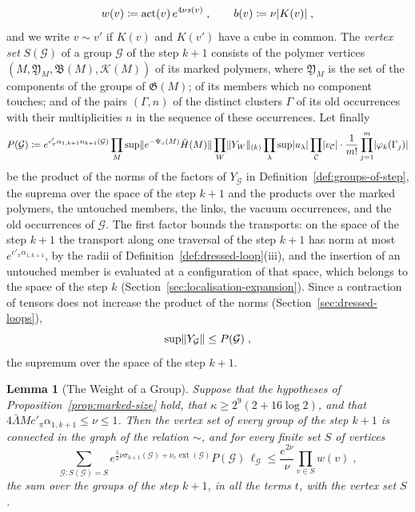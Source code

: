 \documentclass[11pt]{preprint}
\DeclarePairedDelimiter{\abs}{\lvert}{\rvert}
\DeclarePairedDelimiter{\norm}{\lVert}{\rVert}
\numberwithin{equation}{section}
\newtheorem{lemma}[theorem]{Lemma}
\theoremstyle{definition}
\theoremstyle{remark}
\theoremstyle{plain}
\begin{document}
\begin{equation}\label{eq:vertex-weights}
    w(v) \coloneqq \operatorname{act}(v)\,e^{4\nu s(v)}\;,
    \qquad
    b(v) \coloneqq \nu\abs{K(v)}\;,
\end{equation}
and we write $v \sim v'$ if $K(v)$ and $K(v')$ have a cube in common. The \emph{vertex set} $S(\mathcal G)$ of a group $\mathcal G$ of the step $k + 1$ consists of the polymer vertices $(M, \mathfrak Y_M, \mathfrak B(M), \mathcal K(M))$ of its marked polymers, where $\mathfrak Y_M$ is the set of the components of the groups of $\mathfrak G(M)$; of its members which no component touches; and of the pairs $(\Gamma, n)$ of the distinct clusters $\Gamma$ of its old occurrences with their multiplicities $n$ in the sequence of these occurrences. Let finally
\begin{equation}\label{eq:group-product}
    P(\mathcal G) \coloneqq e^{c'_\pi\alpha_{1,k+1}n_{k+1}(\mathcal G)}\prod_M\sup\norm{e^{-\Psi_\circ(M)}\tilde H(M)}\prod_W\norm{Y_W}_{(k)}\prod_\lambda\sup\abs{u_\lambda}\prod_{\mathcal C}\abs{v_{\mathcal C}}\cdot\frac{1}{m!}\prod_{j=1}^{m}\abs{\varphi_k(\Gamma_j)}
\end{equation}
be the product of the norms of the factors of $Y_{\mathcal G}$ in Definition~\ref{def:groups-of-step}, the suprema over the space of the step $k + 1$ and the products over the marked polymers, the untouched members, the links, the vacuum occurrences, and the old occurrences of $\mathcal G$. The first factor bounds the transports: on the space of the step $k + 1$ the transport along one traversal of the step $k + 1$ has norm at most $e^{c'_\pi\alpha_{1,k+1}}$, by the radii of Definition~\ref{def:dressed-loop}(iii), and the insertion of an untouched member is evaluated at a configuration of that space, which belongs to the space of the step $k$ (Section~\ref{sec:localisation-expansion}). Since a contraction of tensors does not increase the product of the norms (Section~\ref{sec:dressed-loops}),
\begin{equation}\label{eq:group-sup}
    \sup\norm{Y_{\mathcal G}} \leq P(\mathcal G)\;,
\end{equation}
the supremum over the space of the step $k + 1$.

\begin{lemma}[The Weight of a Group]\label{lem:group-weight}
Suppose that the hypotheses of Proposition~\ref{prop:marked-size} hold, that $\kappa \geq 2^9(2 + 16\log 2)$, and that $4\bar\Lambda Mc'_\pi\alpha_{1,k+1} \leq \nu \leq 1$. Then the vertex set of every group of the step $k + 1$ is connected in the graph of the relation $\sim$, and for every finite set $S$ of vertices
\begin{equation}\label{eq:group-weight}
    \sum_{\mathcal G\colon S(\mathcal G) = S}e^{\frac52\nu\sigma_{k+1}(\mathcal G) + \nu_e\operatorname{ext}(\mathcal G)}P(\mathcal G)\,\ell_{\mathcal G} \leq \frac{e^{2\nu}}{\nu}\prod_{v \in S}w(v)\;,
\end{equation}
the sum over the groups of the step $k + 1$, in all the terms $t$, with the vertex set $S$.
\end{lemma}
\end{document}
